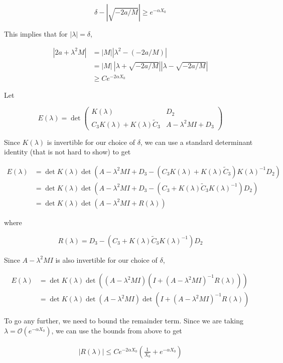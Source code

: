 \documentclass[12pt]{article}
\begin{document}
\begin{enumerate}
\[
\delta - |\sqrt{-2a/M}| \geq e^{-\alpha X_0}
\]

This implies that for $|\lambda| = \delta$,

\begin{align*}
|2a + \lambda^2 M| &= |M||\lambda^2 - (-2a/M)| \\
&= |M|\:|\lambda + \sqrt{-2a/M}||\lambda - \sqrt{-2a/M}| \\
&\geq C e^{-2 \alpha X_0}
\end{align*}

Let

\begin{equation}
E(\lambda) = \det
\begin{pmatrix}
K(\lambda) & D_2 \\
C_3 K(\lambda) + K(\lambda) \tilde{C}_3 & A - \lambda^2 MI + D_3
\end{pmatrix}
\end{equation}

Since $K(\lambda)$ is invertible for our choice of $\delta$, we can use a standard determinant identity (that is not hard to show) to get

\begin{align*}
E(\lambda) &= \det K(\lambda) \det(A - \lambda^2 MI + D_3 - (C_3 K(\lambda) + K(\lambda) \tilde{C}_3) K(\lambda)^{-1} D_2 ) \\
&= \det K(\lambda) \det(A - \lambda^2 MI + D_3 - (C_3 + K(\lambda) \tilde{C}_3 K(\lambda)^{-1} ) D_2 ) \\
&= \det K(\lambda) \det(A - \lambda^2 MI + R(\lambda) )
\end{align*}

where

\[
R(\lambda) = D_3 - (C_3 + K(\lambda) \tilde{C}_3 K(\lambda)^{-1} ) D_2
\]

Since $A - \lambda^2 MI$ is also invertible for our choice of $\delta$,

\begin{align*}
E(\lambda) &= \det K(\lambda) \det((A - \lambda^2 MI)(I + (A - \lambda^2 MI)^{-1} R(\lambda) ))\\
&= \det K(\lambda) \det(A - \lambda^2 MI) \det (I + (A - \lambda^2 MI)^{-1} R(\lambda) )
\end{align*}

To go any further, we need to bound the remainder term. Since we are taking $\lambda = \mathcal{O}(e^{-\alpha X_0})$, we can use the bounds from above to get

\begin{align*}
|R(\lambda)| \leq C e^{-2 \alpha X_0}\left( \frac{1}{X_0} + e^{-\alpha X_0} \right)
\end{align*}


\end{enumerate}
\end{document}
